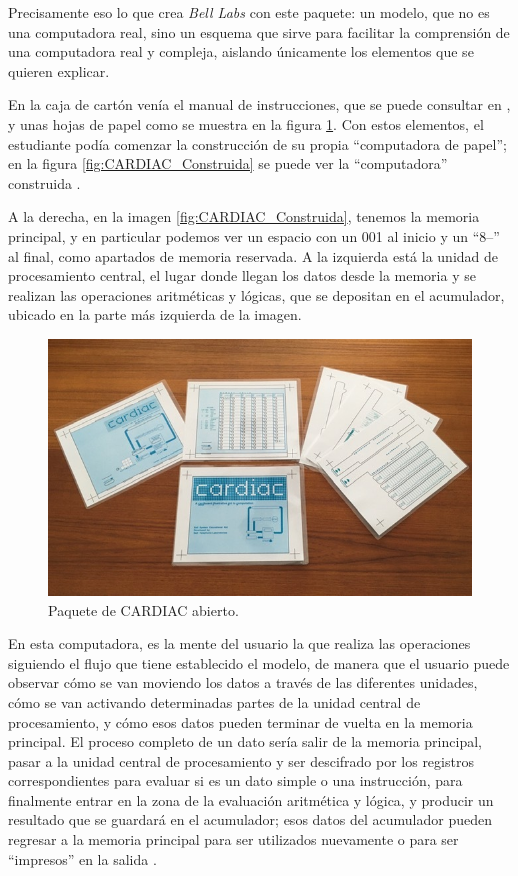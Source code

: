 \documentclass[letterpaper,12pt,oneside]{book}
\begin{document}
        Precisamente eso lo que crea \textit{Bell Labs} con este paquete: un modelo, que no es una computadora real, sino un esquema
        que sirve para facilitar la comprensión de una computadora real y compleja, aislando únicamente los elementos que se quieren explicar.
        
  
        En la caja de cartón venía el manual de instrucciones, que se puede consultar en  
		\cite{fingerman_instruction_1968}, y unas hojas de papel como se muestra en la figura \ref{fig:Kit_CARDIAC}. Con estos elementos, el 
		estudiante podía comenzar la construcción de su propia ``computadora de papel''; en la figura \ref{fig:CARDIAC_Construida} se puede
		ver la ``computadora'' construida \cite{megardi_cardiac_nodate}.
  
		A la derecha, en la imagen \ref{fig:CARDIAC_Construida}, tenemos la memoria principal, y en particular podemos ver un espacio con un 001 al inicio y un ``8--'' al final, como apartados de memoria reservada. A la izquierda
		está la unidad de procesamiento central, el lugar donde llegan los datos desde la memoria y se realizan las operaciones aritméticas y lógicas,
		que se depositan en el acumulador, ubicado en la parte más izquierda de la imagen.
		
		\begin{figure}[h]
		\centering
			\includegraphics[scale=0.6]{media/CARDIAC_Paper/paper1.jpg}
			\caption{Paquete de CARDIAC abierto.}
			\label{fig:Kit_CARDIAC}%
		\end{figure}
		
		
		
		En esta computadora, es la mente del usuario la que realiza las operaciones  siguiendo el flujo que tiene establecido el modelo, de manera
		que el usuario  puede observar cómo se van moviendo los datos a través de las diferentes unidades, cómo se van activando determinadas
		partes de la unidad central de procesamiento, y cómo  esos datos pueden terminar de vuelta en la memoria principal. El proceso completo de un dato sería salir de la memoria principal, pasar
		a la unidad central de procesamiento y ser descifrado por los registros correspondientes para evaluar si es un dato simple o una instrucción,
		para finalmente entrar en la zona de la evaluación aritmética y lógica, y producir un resultado que se guardará en el acumulador; esos
		datos del acumulador pueden regresar a la memoria principal para ser utilizados nuevamente o para ser ``impresos'' en la salida \cite{fingerman_instruction_1968}.
		
\end{document}
